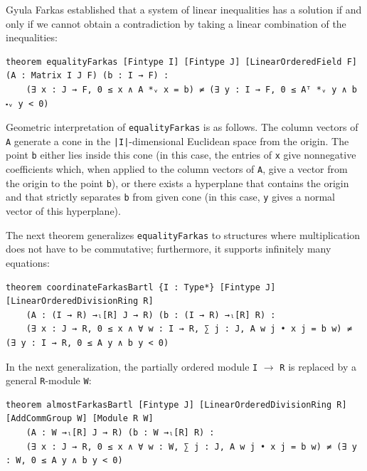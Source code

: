 \documentclass[]{article}
\renewcommand{\.}{\hskip .75pt}
\let\r=\rightarrow
\begin{document}
	

Gyula Farkas established that a system of linear inequalities has a solution if and only if we cannot obtain
a contradiction by taking a linear combination of the inequalities:
\begin{lstlisting}
theorem equalityFarkas [Fintype I] [Fintype J] [LinearOrderedField F] (A : Matrix I J F) (b : I → F) :
    (∃ x : J → F, 0 ≤ x ∧ A *ᵥ x = b) ≠ (∃ y : I → F, 0 ≤ Aᵀ *ᵥ y ∧ b ⬝ᵥ y < 0)
\end{lstlisting}

Geometric interpretation of \texttt{equalityFarkas} is as follows.
The column vectors of \texttt{A} generate a cone in the
\texttt{|I|}-dimensional Euclidean space from the origin.
The point \texttt{b} either lies inside this cone (in this case, the entries
of \texttt{x} give nonnegative coefficients which,
when applied to the column vectors of \texttt{A},
give a vector from the origin to the point \texttt{b}),
or there exists a hyperplane that contains the origin and that
strictly separates \texttt{b} from given cone
(in this case, \texttt{y} gives a normal vector of this hyperplane).

The next theorem generalizes \texttt{equalityFarkas} to structures where
multiplication does not have to be commutative;
furthermore, it supports infinitely many equations:
\begin{lstlisting}
theorem coordinateFarkasBartl {I : Type*} [Fintype J] [LinearOrderedDivisionRing R]
    (A : (I → R) →ₗ[R] J → R) (b : (I → R) →ₗ[R] R) :
    (∃ x : J → R, 0 ≤ x ∧ ∀ w : I → R, ∑ j : J, A w j • x j = b w) ≠ (∃ y : I → R, 0 ≤ A y ∧ b y < 0)
\end{lstlisting}

In the next generalization, the partially ordered module \texttt{I} $\r$ \texttt{R}
is replaced by a general \texttt{R}-module \texttt{W}:
\begin{lstlisting}
theorem almostFarkasBartl [Fintype J] [LinearOrderedDivisionRing R] [AddCommGroup W] [Module R W]
    (A : W →ₗ[R] J → R) (b : W →ₗ[R] R) :
    (∃ x : J → R, 0 ≤ x ∧ ∀ w : W, ∑ j : J, A w j • x j = b w) ≠ (∃ y : W, 0 ≤ A y ∧ b y < 0)
\end{lstlisting}
\end{document}
